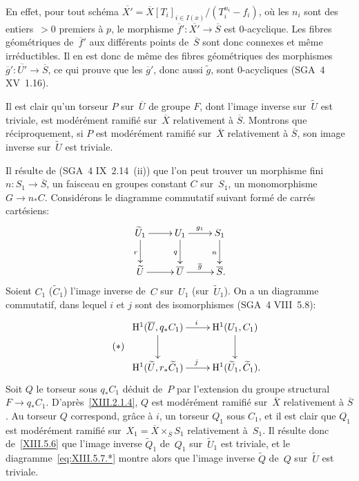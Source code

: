 En effet, pour tout sch\'ema
$\overline{X'}=\overline{X}[T_{i}]_{i\in I(x)}\big/
(T_{i}^{n_{i}}-f_{i})$, o\`u les $n_{i}$ sont des entiers~$>0$
premiers \`a $p$, le morphisme
$\overline{f}'\colon\overline{X'}\to\overline{S}$ est $0$-acyclique.
Les fibres g\'eom\'etriques de~$\overline{f}'$ aux diff\'erents
points de~$\overline{S}$ sont donc connexes et m\^eme
irr\'eductibles. Il en est donc de m\^eme des fibres
g\'eom\'etriques des morphismes
$\overline{g}'\colon\overline{U'}\to\overline{S}$, ce qui prouve que
les $\overline{g}'$, donc aussi $\tilde g$, sont
$0$-acycliques (SGA~4 XV~1.16).

Il est clair qu'un torseur $P$ sur~$\overline{U}$ de groupe $F$, dont
l'image inverse sur~$\widetilde{U}$ est triviale, est
mod\'er\'ement ramifi\'e sur~$\overline{X}$ relativement \`a
$\overline{S}$. Montrons que r\'eciproquement, si $P$ est
mod\'er\'ement ramifi\'e sur~$\overline{X}$ relativement \`a
$\overline{S}$, son image inverse sur~$\widetilde{U}$ est triviale.

Il r\'esulte de (SGA~4 IX~2.14~(ii)) que l'on peut trouver un
morphisme fini $n\colon S_{1}\to\overline{S}$, un faisceau en groupes
constant $C$ sur~$S_{1}$, un monomorphisme $G\to n_*C$.
Consid\'erons le diagramme commutatif suivant form\'e de
carr\'es cart\'esiens:
$$
\xymatrix{{\widetilde{U}_{1}}\ar[r]\ar[d]_{r}&{U_{1}}\ar[r]^{g_{1}}\ar[d]_{q}&{S_{1}}\ar[d]_{n}\\{\widetilde{U}}\ar[r]&{\overline{U}}\ar[r]^{\overline{g}}&{\overline{S} \rlap{\quoi.}}\\ }
$$
Soient
$C_{1}$ (\resp $\widetilde{C}_{1}$) l'image inverse de~$C$ sur~$U_{1}$
(\resp sur~$\widetilde{U}_{1}$). On a un diagramme commutatif, dans
lequel $i$ et $j$ sont des isomorphismes (SGA~4 VIII~5.8):
\begin{equation*}
\label{eq:XIII.5.7.*}
\tag{$*$}
\begin{array}{c}
\xymatrix{{\H^{1}(\overline{U},q_*C_{1})}\ar[r]^{i}\ar[d]&{\H^{1}(U_{1},C_{1})}\ar[d]\\{\H^{1}(\widetilde{U},r_*\widetilde{C}_{1})}\ar[r]^{j}&{\H^{1}(\widetilde{U}_{1},\widetilde{C}_{1}) \rlap{\quoi.}}\\ }
\end{array}
\end{equation*}
Soit $Q$ le torseur sous $q_*C_{1}$ d\'eduit de~$P$ par
l'extension du groupe structural $F\to q_*C_{1}$.
D'apr\`es~\ref{XIII.2.1.4}, $Q$ est mod\'er\'ement ramifi\'e
sur~$\overline{X}$ relativement \`a $\overline{S}$. Au torseur $Q$
correspond, gr\^ace \`a $i$, un torseur $Q_{1}$ sous $C_{1}$, et
il est clair que $Q_{1}$ est mod\'er\'ement ramifi\'e sur~$X_{1}=\overline{X}\times_{\overline{S}}S_{1}$ relativement \`a~$S_{1}$. Il r\'esulte donc de~\ref{XIII.5.6} que l'image inverse
$\widetilde{Q}_{1}$ de~$Q_{1}$ sur~$\widetilde{U}_{1}$ est triviale,
et le diagramme~\eqref{eq:XIII.5.7.*} montre alors que l'image inverse
$\widetilde{Q}$ de~$Q$ sur~$\widetilde{U}$ est triviale.

